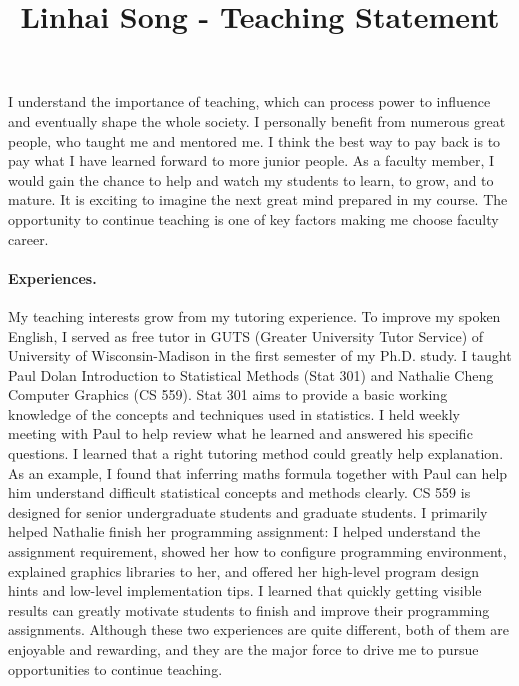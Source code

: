 \documentclass[10pt]{article}
\title{\vspace{-.7in}\bf{Linhai Song - Teaching Statement\vspace{-.4in}}}
\date{}
\begin{document}
\maketitle\vspace{-.2in}

I understand the importance of teaching, 
which can process power to influence and eventually shape the whole society. 
I personally benefit from numerous great people, who taught me and mentored me. 
I think the best way to pay back is to pay what I have learned forward to more junior people. 
As a faculty member, I would gain the chance to help and watch my students to learn, to grow, and to mature. 
It is exciting to imagine the next great mind prepared in my course.
The opportunity to continue teaching is one of key factors making me choose faculty career. 

\vspace{-0.1in}
\paragraph*{Experiences.} My teaching interests grow from my tutoring experience. 
To improve my spoken English, 
I served as free tutor in GUTS (Greater University Tutor Service) of University of Wisconsin-Madison in the first semester of my Ph.D. study. 
I taught Paul Dolan Introduction to Statistical Methods (Stat 301) and Nathalie Cheng Computer Graphics (CS 559). 
Stat 301 aims to provide a basic working knowledge of the concepts and techniques used in statistics. 
I held weekly meeting with Paul to help review what he learned and answered his specific questions. 
I learned that a right tutoring method could greatly help explanation. 
As an example, I found that inferring maths formula together with Paul can help him understand difficult statistical concepts and methods clearly. 
CS 559 is designed for senior undergraduate students and graduate students. 
I primarily helped Nathalie finish her programming assignment: 
I helped understand the assignment requirement, 
showed her how to configure programming environment, 
explained graphics libraries to her, 
and offered her high-level program design hints and low-level implementation tips. 
I learned that quickly getting visible results can 
greatly motivate students to finish and improve their programming assignments. 
Although these two experiences are quite different, both of them are enjoyable and rewarding, 
and they are the major force to drive me to pursue opportunities to continue teaching.
\end{document}
